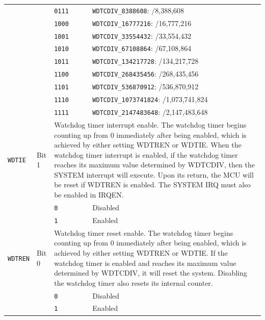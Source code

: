 \begin{tabularx}{\textwidth}{ l l l X }
 & & \cellcolor{tablehighlightcolor}\texttt{0111} & \cellcolor{tablehighlightcolor}\texttt{WDTCDIV\_8388608}: /8,388,608 \\
 & & \texttt{1000} & \texttt{WDTCDIV\_16777216}: /16,777,216 \\
 & & \cellcolor{tablehighlightcolor}\texttt{1001} & \cellcolor{tablehighlightcolor}\texttt{WDTCDIV\_33554432}: /33,554,432 \\
 & & \texttt{1010} & \texttt{WDTCDIV\_67108864}: /67,108,864 \\
 & & \cellcolor{tablehighlightcolor}\texttt{1011} & \cellcolor{tablehighlightcolor}\texttt{WDTCDIV\_134217728}: /134,217,728 \\
 & & \texttt{1100} & \texttt{WDTCDIV\_268435456}: /268,435,456 \\
 & & \cellcolor{tablehighlightcolor}\texttt{1101} & \cellcolor{tablehighlightcolor}\texttt{WDTCDIV\_536870912}: /536,870,912 \\
 & & \texttt{1110} & \texttt{WDTCDIV\_1073741824}: /1,073,741,824 \\
 & & \cellcolor{tablehighlightcolor}\texttt{1111} & \cellcolor{tablehighlightcolor}\texttt{WDTCDIV\_2147483648}: /2,147,483,648 \\
\hline
\texttt{WDTIE} & Bit 1 & \multicolumn{2}{X}{Watchdog timer interrupt enable. The watchdog timer begins counting up from 0 immediately after being enabled, which is achieved by either setting WDTREN or WDTIE. When the watchdog timer interrupt is enabled, if the watchdog timer reaches its maximum value determined by WDTCDIV, then the SYSTEM interrupt will execute. Upon its return, the MCU will be reset if WDTREN is enabled. The SYSTEM IRQ must also be enabled in IRQEN.} \\
 & & \texttt{0} & Disabled \\
 & & \cellcolor{tablehighlightcolor}\texttt{1} & \cellcolor{tablehighlightcolor}Enabled \\
\hline
\texttt{WDTREN} & Bit 0 & \multicolumn{2}{X}{Watchdog timer reset enable. The watchdog timer begins counting up from 0 immediately after being enabled, which is achieved by either setting WDTREN or WDTIE. If the watchdog timer is enabled and reaches its maximum value determined by WDTCDIV, it will reset the system. Disabling the watchdog timer also resets its internal counter.} \\
 & & \texttt{0} & Disabled \\
 & & \cellcolor{tablehighlightcolor}\texttt{1} & \cellcolor{tablehighlightcolor}Enabled \\
\hline
\end{tabularx}

